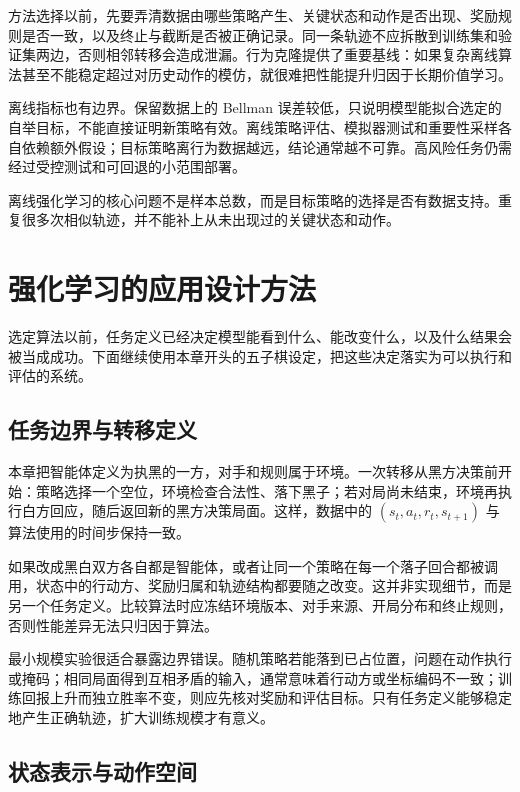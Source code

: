 方法选择以前，先要弄清数据由哪些策略产生、关键状态和动作是否出现、奖励规则是否一致，以及终止与截断是否被正确记录。同一条轨迹不应拆散到训练集和验证集两边，否则相邻转移会造成泄漏。行为克隆提供了重要基线：如果复杂离线算法甚至不能稳定超过对历史动作的模仿，就很难把性能提升归因于长期价值学习。

离线指标也有边界。保留数据上的 Bellman 误差较低，只说明模型能拟合选定的自举目标，不能直接证明新策略有效。离线策略评估、模拟器测试和重要性采样各自依赖额外假设；目标策略离行为数据越远，结论通常越不可靠。高风险任务仍需经过受控测试和可回退的小范围部署。

\begin{importantnote}
  离线强化学习的核心问题不是样本总数，而是目标策略的选择是否有数据支持。重复很多次相似轨迹，并不能补上从未出现过的关键状态和动作。
\end{importantnote}

\section{强化学习的应用设计方法}

选定算法以前，任务定义已经决定模型能看到什么、能改变什么，以及什么结果会被当成成功。下面继续使用本章开头的五子棋设定，把这些决定落实为可以执行和评估的系统。

\subsection{任务边界与转移定义}

本章把智能体定义为执黑的一方，对手和规则属于环境。一次转移从黑方决策前开始：策略选择一个空位，环境检查合法性、落下黑子；若对局尚未结束，环境再执行白方回应，随后返回新的黑方决策局面。这样，数据中的 $(s_t,a_t,r_t,s_{t+1})$ 与算法使用的时间步保持一致。

如果改成黑白双方各自都是智能体，或者让同一个策略在每一个落子回合都被调用，状态中的行动方、奖励归属和轨迹结构都要随之改变。这并非实现细节，而是另一个任务定义。比较算法时应冻结环境版本、对手来源、开局分布和终止规则，否则性能差异无法只归因于算法。

最小规模实验很适合暴露边界错误。随机策略若能落到已占位置，问题在动作执行或掩码；相同局面得到互相矛盾的输入，通常意味着行动方或坐标编码不一致；训练回报上升而独立胜率不变，则应先核对奖励和评估目标。只有任务定义能够稳定地产生正确轨迹，扩大训练规模才有意义。

\subsection{状态表示与动作空间}

